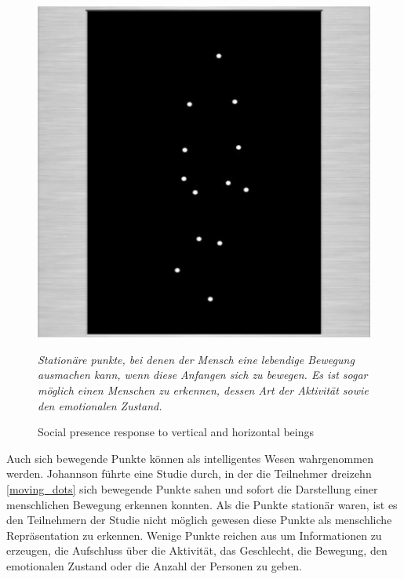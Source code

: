 \documentclass[a4paper,11pt]{article}%
\renewcommand{\\}{\vspace*{0.5\baselineskip} \newline}
\begin{document}
{\begin{figure}[H]
		\begin{footnotesize}
		\centering
			\includegraphics[scale= 0.5]{Abbildungen/moving_dots.JPG}
			\caption[Abbildung 1]{Social presence response to vertical and
horizontal beings}
			\textit{Stationäre punkte, bei denen der Mensch eine lebendige Bewegung ausmachen kann, wenn diese Anfangen sich zu bewegen. Es ist sogar möglich einen Menschen zu erkennen, dessen Art der Aktivität sowie den emotionalen Zustand. \citep{biocca2002defining} \citep[p.76-89]{johansson1975visual}}

			\label{moving_dots}
		\end{footnotesize}
	\end{figure}

Auch sich bewegende Punkte können als intelligentes Wesen wahrgenommen werden. Johannson \citep[p.76-89]{johansson1975visual} führte eine Studie durch, in der die Teilnehmer dreizehn \autoref{moving_dots} sich bewegende Punkte sahen und sofort die Darstellung einer menschlichen Bewegung erkennen konnten. Als die Punkte stationär waren, ist es den Teilnehmern der Studie nicht möglich gewesen diese Punkte als menschliche Repräsentation zu erkennen. Wenige Punkte reichen aus um Informationen zu erzeugen, die Aufschluss über die Aktivität, das Geschlecht, die Bewegung, den emotionalen Zustand oder die Anzahl der Personen zu geben.


}
\end{document}
